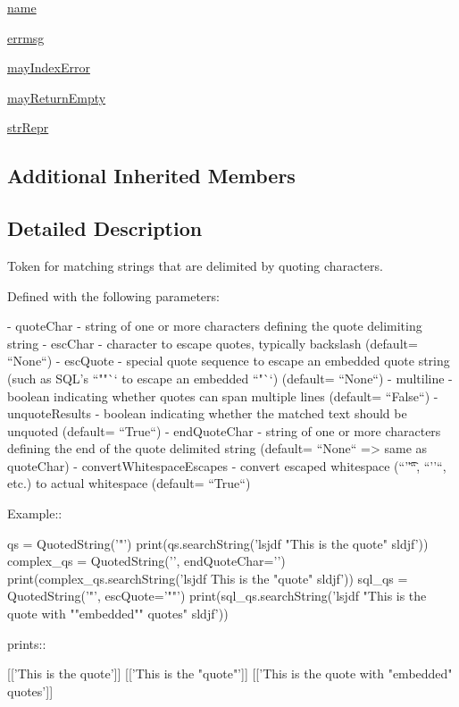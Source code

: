 \begin{DoxyCompactItemize}
\item 
\hyperlink{classpip_1_1__vendor_1_1pyparsing_1_1QuotedString_a0144ceb022febfb94d0b5a560f6f93ce}{name}
\item 
\hyperlink{classpip_1_1__vendor_1_1pyparsing_1_1QuotedString_a1c27b21da717a2f27cc310d261805e85}{errmsg}
\item 
\hyperlink{classpip_1_1__vendor_1_1pyparsing_1_1QuotedString_accd4c9fbb266df6116ca13f2fd768118}{may\+Index\+Error}
\item 
\hyperlink{classpip_1_1__vendor_1_1pyparsing_1_1QuotedString_ab8f88d4621f649e962af8c25b20cc17b}{may\+Return\+Empty}
\item 
\hyperlink{classpip_1_1__vendor_1_1pyparsing_1_1QuotedString_af365245321e00704b05a20bfea4d1bf0}{str\+Repr}
\end{DoxyCompactItemize}
\subsection*{Additional Inherited Members}


\subsection{Detailed Description}
\begin{DoxyVerb}Token for matching strings that are delimited by quoting characters.

Defined with the following parameters:

    - quoteChar - string of one or more characters defining the
      quote delimiting string
    - escChar - character to escape quotes, typically backslash
      (default= ``None``)
    - escQuote - special quote sequence to escape an embedded quote
      string (such as SQL's ``""`` to escape an embedded ``"``)
      (default= ``None``)
    - multiline - boolean indicating whether quotes can span
      multiple lines (default= ``False``)
    - unquoteResults - boolean indicating whether the matched text
      should be unquoted (default= ``True``)
    - endQuoteChar - string of one or more characters defining the
      end of the quote delimited string (default= ``None``  => same as
      quoteChar)
    - convertWhitespaceEscapes - convert escaped whitespace
      (``'\t'``, ``'\n'``, etc.) to actual whitespace
      (default= ``True``)

Example::

    qs = QuotedString('"')
    print(qs.searchString('lsjdf "This is the quote" sldjf'))
    complex_qs = QuotedString('{{', endQuoteChar='}}')
    print(complex_qs.searchString('lsjdf {{This is the "quote"}} sldjf'))
    sql_qs = QuotedString('"', escQuote='""')
    print(sql_qs.searchString('lsjdf "This is the quote with ""embedded"" quotes" sldjf'))

prints::

    [['This is the quote']]
    [['This is the "quote"']]
    [['This is the quote with "embedded" quotes']]
\end{DoxyVerb}
 

